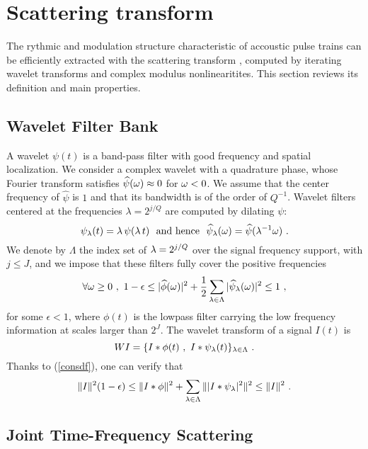 \section{Scattering transform}

The rythmic and modulation structure characteristic of accoustic pulse trains 
can be efficiently extracted with the scattering transform \cite{pami, mallat}, 
computed by iterating wavelet transforms and complex modulus nonlinearitites.
This section reviews its definition and main properties. 

\subsection{Wavelet Filter Bank}

A wavelet $\psi (t)$ is a band-pass filter with good frequency and spatial localization.
 We consider a complex wavelet with a quadrature phase, 
whose Fourier transform satisfies
$\widehat \psi({\omega}) \approx 0$ for ${\omega} < 0$.
We assume that the center frequency of $\widehat \psi$ is $1$ and 
that its bandwidth is of the order of $Q^{-1}$. 
Wavelet filters centered
at the frequencies $\lambda = 2^{j/Q}$ are computed by dilating $\psi$:
\begin{equation}
\label{psidilation}
\psi_{\lambda} (t) = {\lambda}\, \psi({\lambda}\, t)~~\mbox{and hence}~~
\widehat \psi_{\lambda} ({\omega}) = \widehat \psi({\lambda}^{-1} \omega)~.
\end{equation}
We denote by $\Lambda$ the index set of ${\lambda} = 2^{j/Q}$ over
the signal frequency support, with $j \leq J$, 
and we impose that these filters fully cover the positive frequencies
\begin{equation}
\label{consdf}
\forall {\omega} \geq 0~,~ 1- \epsilon 
\leq |\widehat{\phi}(\omega)|^2 + \frac 1 2 \sum_{{\lambda} \in \Lambda} |\widehat{\psi}_{\lambda}(\omega)|^2 \leq 1~,
\end{equation}
for some $\epsilon <1$, where $\phi(t)$ is the lowpass filter carrying the 
low frequency information at scales larger than $2^J$.
The wavelet transform of a signal $I(t)$ is
\[
W I = \{I \ast \phi(t)~,~I \ast \psi_{\lambda}(t)  \}_{{\lambda} \in \Lambda}~.
\]
Thanks to (\ref{consdf}), one can verify that 
\begin{equation}
\label{lp_basic}
\| I \|^2 (1- \epsilon) \leq \| I \ast \phi \|^2 + \sum_{{\lambda} \in \Lambda} \| |I \ast \psi_{\lambda}|^2 \|^2  \leq \| I \|^2~.
\end{equation}

\subsection{Joint Time-Frequency Scattering}


